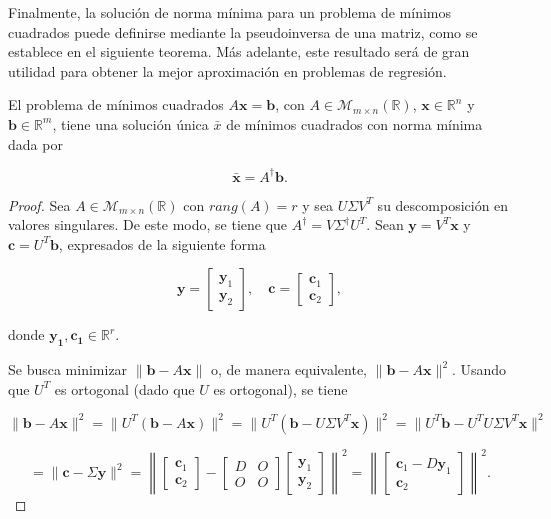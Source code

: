 Finalmente, la solución de norma mínima para un problema de mínimos cuadrados puede definirse mediante la pseudoinversa de una matriz, como se establece en el siguiente teorema. Más adelante, este resultado será de gran utilidad para obtener la mejor aproximación en problemas de regresión.

\begin{teorema}
    El problema de mínimos cuadrados $A\mathbf{x}=\mathbf{b}$, con $A \in \mathcal{M}_{m \times n}(\mathbb{R})$, $\mathbf{x} \in \mathbb{R}^{n}$ y $\mathbf{b} \in \mathbb{R}^{m}$, tiene una solución única $\bar{x}$ de mínimos cuadrados con norma mínima dada por

    \[ \bar{\mathbf{x}} = A^{\dagger}\mathbf{b}. \]
\end{teorema}

\begin{proof}
    Sea $A \in \mathcal{M}_{m \times n}(\mathbb{R})$ con $rang(A) = r$ y sea $U\Sigma V^{T}$ su descomposición en valores singulares. De este modo, se tiene que $A^{\dagger} = V \Sigma^{\dagger} U^{T}$. Sean $\mathbf{y}=V^{T}\mathbf{x}$ y $\mathbf{c}=U^{T}\mathbf{b}$, expresados de la siguiente forma

    \[
        \mathbf{y} = \begin{bmatrix} \mathbf{y}_1 \\ \mathbf{y}_2 \end{bmatrix}, \quad 
        \mathbf{c} = \begin{bmatrix} \mathbf{c}_1 \\ \mathbf{c}_2 \end{bmatrix},
    \]

    donde $\mathbf{y_1}, \mathbf{c_1} \in \mathbb{R}^{r}$.

    Se busca minimizar $\|\mathbf{b} - A \mathbf{x}\|$ o, de manera equivalente, $\|\mathbf{b} - A \mathbf{x}\|^2$. Usando que $U^T$ es ortogonal (dado que $U$ es ortogonal), se tiene  

    \[
        \|\mathbf{b} - A \mathbf{x}\|^2 = \| U^T (\mathbf{b} - A \mathbf{x}) \|^2 = \| U^T (\mathbf{b} - U \Sigma V^T \mathbf{x}) \|^2 = \| U^T \mathbf{b} - U^T U \Sigma V^T \mathbf{x} \|^2
    \]

    \[
        = \|\mathbf{c} - \Sigma \mathbf{y}\|^2 = \left\| \begin{bmatrix} \mathbf{c}_1 \\ \mathbf{c}_2 \end{bmatrix} - \begin{bmatrix} D & O \\ O & O \end{bmatrix} \begin{bmatrix} \mathbf{y}_1 \\ \mathbf{y}_2 \end{bmatrix} \right\|^2 = \left\| \begin{bmatrix} \mathbf{c}_1 - D \mathbf{y}_1 \\ \mathbf{c}_2 \end{bmatrix} \right\|^2.
    \]


\end{proof}
